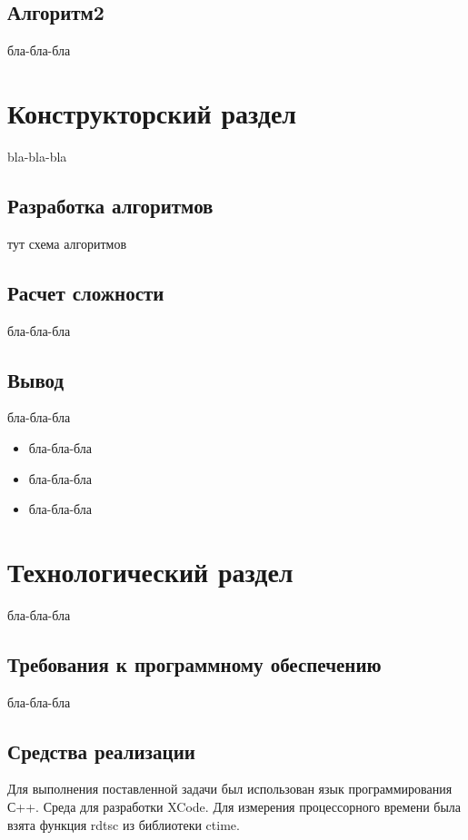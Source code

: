 \documentclass[12pt, a4paper]{report}
\begin{document}
	\section{Алгоритм2}
	бла-бла-бла
	

	\chapter{Конструкторский раздел}
	
	\vspace{-0.5cm} bla-bla-bla
	
	\section{Разработка алгоритмов}
	тут схема алгоритмов

	\newpage

	\section{Расчет сложности}
	бла-бла-бла
	
	\section{Вывод}
	бла-бла-бла
	
	\begin{itemize}
		\item бла-бла-бла
		\item бла-бла-бла
		\item бла-бла-бла
	\end{itemize}
	
	\chapter{Технологический раздел}
	\vspace{-0.5cm}бла-бла-бла
	
	\section{Требования к программному обеспечению}
	бла-бла-бла
	\section{Средства реализации}
	\hspace{0.6cm}Для выполнения поставленной задачи был использован язык программирования С++. Среда для разработки XCode. Для измерения процессорного времени была взята функция rdtsc из библиотеки ctime.
	
\end{document}
